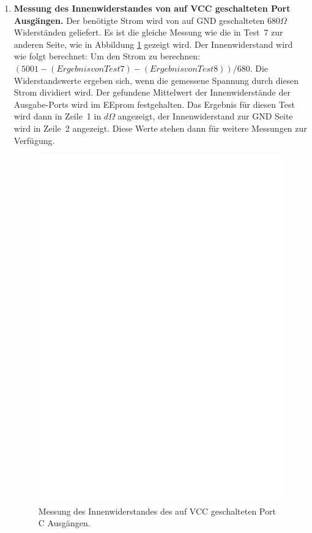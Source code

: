 \begin{enumerate}
\item {\bf Messung des Innenwiderstandes von auf VCC geschalteten Port Ausg\"angen.}
Der ben\"otigte Strom wird von auf GND geschalteten \(680\Omega\) Widerst\"anden geliefert.
Es ist die gleiche Messung wie die in Test~7 zur anderen Seite, wie in Abbildung \ref{fig:test8} gezeigt wird.
Der Innenwiderstand wird wie folgt berechnet:
Um den Strom zu berechnen: \((5001 - (Ergebnis von Test 7) - (Ergebnis von Test 8)) / 680\).
Die Widerstandswerte ergeben sich, wenn die gemessene Spannung durch diesen Strom dividiert wird.
Der gefundene Mittelwert der Innenwiderst\"ande der Ausgabe-Ports wird im EEprom festgehalten.
Das Ergebnis f\"ur diesen Test wird dann in Zeile~1 in \(d\Omega\) angezeigt, der Innenwiderstand
zur GND Seite wird in Zeile~2 angezeigt.
Diese Werte stehen dann f\"ur weitere Messungen zur Verf\"ugung.
\begin{figure}[H]
\centering
\includegraphics[]{../FIG/Test8.eps}
\caption{Messung des Innenwiderstandes des auf VCC geschalteten Port C Ausg\"angen.}
\label{fig:test8}
\end{figure}


\end{enumerate}
